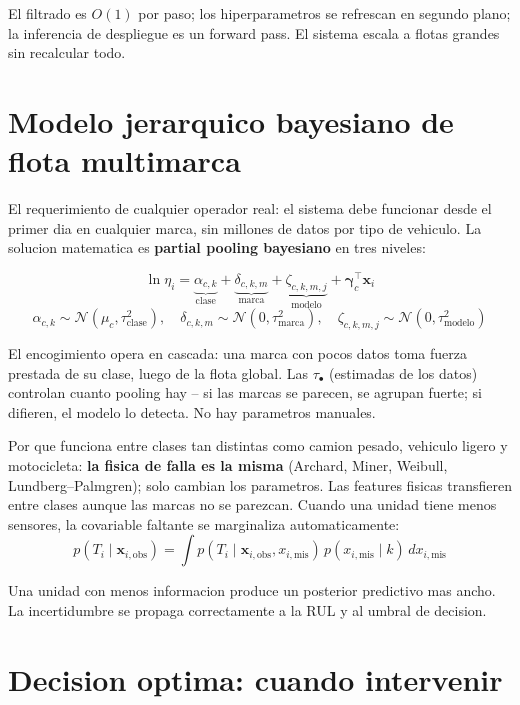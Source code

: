 \documentclass[10.5pt,a4paper]{article}
\begin{document}
El filtrado es $O(1)$ por paso; los hiperparametros se refrescan en segundo
plano; la inferencia de despliegue es un forward pass. El sistema escala a
flotas grandes sin recalcular todo.

\section{Modelo jerarquico bayesiano de flota multimarca}

El requerimiento de cualquier operador real: el sistema debe funcionar desde el
primer dia en cualquier marca, sin millones de datos por tipo de vehiculo.
La solucion matematica es \textbf{partial pooling bayesiano} en tres niveles:

\begin{mathbox}
$$\ln\eta_i = \underbrace{\alpha_{c,k}}_{\text{clase}} +
              \underbrace{\delta_{c,k,m}}_{\text{marca}} +
              \underbrace{\zeta_{c,k,m,j}}_{\text{modelo}} +
              \boldsymbol\gamma_c^\top\mathbf{x}_i$$
$$\alpha_{c,k} \sim \mathcal{N}(\mu_c,\tau_{\text{clase}}^2), \quad
  \delta_{c,k,m} \sim \mathcal{N}(0,\tau_{\text{marca}}^2), \quad
  \zeta_{c,k,m,j} \sim \mathcal{N}(0,\tau_{\text{modelo}}^2)$$
\end{mathbox}

El encogimiento opera en cascada: una marca con pocos datos toma fuerza prestada
de su clase, luego de la flota global. Las $\tau_\bullet$ (estimadas de los datos)
controlan cuanto pooling hay -- si las marcas se parecen, se agrupan fuerte;
si difieren, el modelo lo detecta. No hay parametros manuales.

Por que funciona entre clases tan distintas como camion pesado, vehiculo ligero
y motocicleta: \textbf{la fisica de falla es la misma} (Archard, Miner, Weibull,
Lundberg--Palmgren); solo cambian los parametros. Las features fisicas transfieren
entre clases aunque las marcas no se parezcan. Cuando una unidad tiene menos
sensores, la covariable faltante se marginaliza automaticamente:
$$p(T_i \mid \mathbf{x}_{i,\text{obs}}) =
  \int p(T_i \mid \mathbf{x}_{i,\text{obs}},x_{i,\text{mis}})
  \,p(x_{i,\text{mis}}\mid k)\,dx_{i,\text{mis}}$$

Una unidad con menos informacion produce un posterior predictivo mas ancho.
La incertidumbre se propaga correctamente a la RUL y al umbral de decision.

\section{Decision optima: cuando intervenir}
\end{document}
